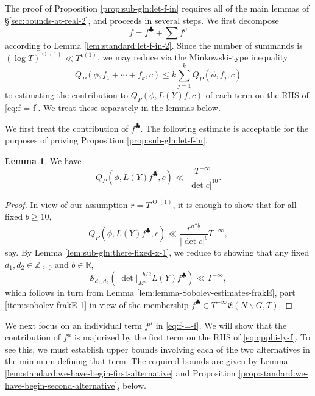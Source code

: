 \documentclass[reqno]{amsart}
\def\O{\operatorname{O}}
\theoremstyle{plain} \newtheorem{theorem} {Theorem}
\theoremstyle{definition} \newtheorem{definition} [theorem] {Definition}
\theoremstyle{itplain} %
\newtheorem{lemma}[theorem]{Lemma}
\numberwithin{equation}{section}
\numberwithin{theorem}{section}
\renewcommand{\geq}{\geqslant}
\renewcommand{\leq}{\leqslant}
\begin{document}
The proof of Proposition \ref{prop:sub-gln:let-f-in} requires all of the main lemmas of \S\ref{sec:bounds-at-real-2}, and proceeds in several steps.  We first decompose
\begin{equation}\label{eq:f-=-f}
  f = f ^{\clubsuit} + \sum f ^\mu
\end{equation}
according to Lemma \ref{lem:standard:let-f-in-2}.  Since the number of summands is $(\log T)^{\O(1)} \ll T^{o(1)}$, we may reduce via the Minkowski-type inequality
\begin{equation*}
  Q_P(\phi, f_1 + \dotsb + f_k, c)
  \leq
  k
  \sum_{j=1}^k
  Q_P(\phi, f_j, c)
\end{equation*}
to estimating the contribution to $Q_P(\phi,L(Y) f,c)$ of each term on the RHS of \eqref{eq:f-=-f}.  We treat these separately in the lemmas below.




We first treat the contribution of $f^{\clubsuit}$.  The following estimate is acceptable for the purposes of proving Proposition \ref{prop:sub-gln:let-f-in}.
\begin{lemma}\label{lemma:20230514162239}
  We have
    \begin{equation*}
    Q_P(\phi, L(Y) f^{\clubsuit},c) \ll
    \frac{T^{-\infty}}{|\det c|^{10}}.
  \end{equation*}
\end{lemma}
\begin{proof}
  In view of our assumption $r = T^{\O(1)}$, it is enough to show that for all fixed $b \geq 10$,
    \begin{equation*}
    Q_P(\phi, L(Y) f^{\clubsuit},c) \ll
    \frac{r^{n'' b}}{|\det c|^{b}} T^{-\infty},
  \end{equation*}
  say.  By Lemma \ref{lem:sub-gln:there-fixed-x-1}, we reduce to showing that any fixed $d_1,d_2 \in \mathbb{Z}_{\geq 0}$ and $b \in \mathbb{R}$,
  \begin{equation}\label{eq:estimate-clubsuit-contribution-trivially}
    \mathcal{S}_{d_1, d_2}(|\det|_{M''}^{-b/2} L(Y) f^{\clubsuit})
    \ll T^{-\infty},
  \end{equation}
  which follows in turn from Lemma \ref{lem:lemma-Sobolev-estimates-frakE}, part \eqref{item:sobolev-frakE-1} in view of the membership $f^{\clubsuit} \in T^{-\infty} \mathfrak{E}(N \backslash G, T)$.
\end{proof}

We next focus on an individual term $f^{\mu}$ in \eqref{eq:f-=-f}.  We will show that the contribution of $f^\mu$ is majorized by the first term on the RHS of \eqref{eq:qpphi-ly-f}.  To see this, we must establish upper bounds involving each of the two alternatives in the minimum defining that term.  The required bounds are given by Lemma \ref{lem:standard:we-have-begin-first-alternative} and Proposition \ref{prop:standard:we-have-begin-second-alternative}, below.
\end{document}
